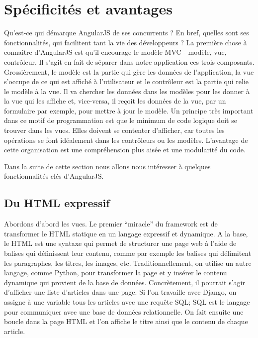 \documentclass[a4paper,10pt,twoside]{sphinxmanual}
\begin{document}
\section{Spécificités et avantages}
\label{angularjs:specificites-et-avantages}
Qu'est-ce qui démarque AngularJS de ses concurrents ? En bref, quelles sont ses fonctionnalités, qui facilitent tant la vie des développeurs ? La première chose à connaitre d'AngularJS est qu'il encourage le modèle MVC - modèle, vue, contrôleur. Il s'agit en fait de séparer dans notre application ces trois composants. Grossièrement, le modèle est la partie qui gère les données de l'application, la vue s'occupe de ce qui est affiché à l'utilisateur et le contrôleur est la partie qui relie le modèle à la vue. Il va chercher les données dans les modèles pour les donner à la vue qui les affiche et, vice-versa, il reçoit les données de la vue, par un formulaire par exemple, pour mettre à jour le modèle. Un principe très important dans ce motif de programmation est que le minimum de code logique doit se trouver dans les vues. Elles doivent se contenter d'afficher, car toutes les opérations se font idéalement dans les contrôleurs ou les modèles. L'avantage de cette organisation est une compréhension plus aisée et une modularité du code.

Dans la suite de cette section nous allons nous intéresser à quelques fonctionnalités clés d'AngularJS.


\subsection{Du HTML expressif}
\label{angularjs:du-html-expressif}
Abordons d'abord les vues. Le premier ``miracle'' du framework est de transformer le HTML statique en un langage expressif et dynamique. A la base, le HTML est une syntaxe qui permet de structurer une page web à l'aide de balises qui définissent leur contenu, comme par exemple les balises qui délimitent les paragraphes, les titres, les images, etc. Traditionnellement, on utilise un autre langage, comme Python, pour transformer la page et y insérer le contenu dynamique qui provient de la base de données. Concrètement, il pourrait s'agir d'afficher une liste d'articles dans une page. Si l'on travaille avec Django, on assigne à une variable  tous les articles avec une requête SQL; SQL est le langage pour communiquer avec une base de données relationnelle. On fait ensuite une boucle dans la page HTML et l'on affiche le titre ainsi que le contenu de chaque article.
\end{document}
